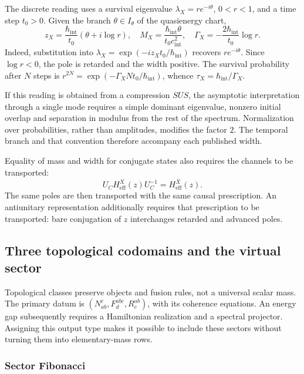 The discrete reading uses a survival eigenvalue
\(\lambda_X=re^{-i\theta}\), \(0<r<1\), and a time step
\(t_0>0\). Given the branch \(\theta\in I_\theta\) of the quasienergy
chart,
\begin{equation}
 z_X=\frac{\hbar_{\mathrm{int}}}{t_0}
 (\theta+i\log r),\quad
 M_X=\frac{\hbar_{\mathrm{int}}\theta}{t_0c_{\mathrm{int}}^2},\quad
 \Gamma_X=-\frac{2\hbar_{\mathrm{int}}}{t_0}\log r.
 \label{vi:vi:eq:anchura-discreta-familias}
\end{equation}
Indeed, substitution into
\(\lambda_X=\exp(-iz_Xt_0/\hbar_{\mathrm{int}})\) recovers
\(re^{-i\theta}\). Since \(\log r<0\), the pole is retarded and the
width positive. The survival probability after \(N\) steps is
\(r^{2N}=\exp(-\Gamma_XNt_0/\hbar_{\mathrm{int}})\), whence
\(\tau_X=\hbar_{\mathrm{int}}/\Gamma_X\).

If this reading is obtained from a compression \(SUS\), the asymptotic
interpretation through a single mode requires a simple dominant
eigenvalue, nonzero initial overlap and separation in modulus from the rest
of the spectrum. Normalization over probabilities, rather than
amplitudes, modifies the factor \(2\). The temporal branch and that convention
therefore accompany each published width.

Equality of mass and width for conjugate states also requires the
channels to be transported:
\[
 U_C H_{\mathrm{eff}}^X(z)U_C^{-1}=H_{\mathrm{eff}}^{\bar X}(z).
\]
The same poles are then transported with the same causal
prescription. An antiunitary representation additionally requires that
prescription to be transported: bare conjugation of \(z\) interchanges
retarded and advanced poles.

\subsection{Three topological codomains and the virtual sector}
\label{vi:vi:subsec:topologicos-familias}

Topological classes preserve objects and fusion rules, not a
universal scalar mass. The primary datum is
\((N_{ab}^{c},F^{abc}_d,R^{ab}_c)\), with its coherence equations.
An energy gap subsequently requires a Hamiltonian realization and
a spectral projector. Assigning this output type makes it possible
to include these sectors without turning them into elementary-mass rows.

\subsubsection{Sector Fibonacci}

